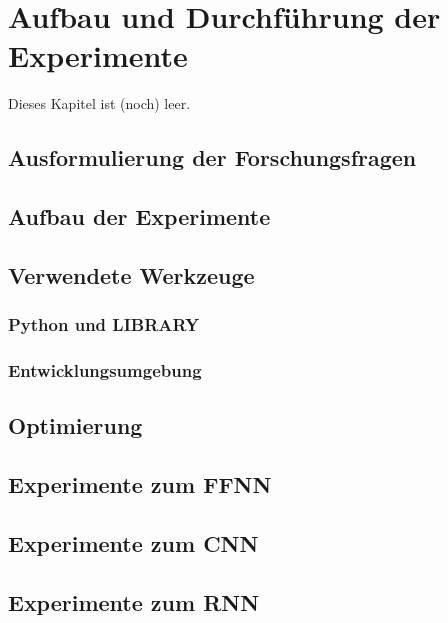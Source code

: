 \documentclass[a4paper,12pt,ngerman,oneside]{scrreprt}	%
\begin{document}
	
		
		
	\chapter{Aufbau und Durchführung der Experimente} \label{Experimente}
	Dieses Kapitel ist (noch) leer.
	
		\section{Ausformulierung der Forschungsfragen}
		\section{Aufbau der Experimente}
		\section{Verwendete Werkzeuge}
			\subsection{Python und LIBRARY}
			\subsection{Entwicklungsumgebung}
		\section{Optimierung}
		\section{Experimente zum FFNN}
		\section{Experimente zum CNN}
		\section{Experimente zum RNN}
	
\end{document}
